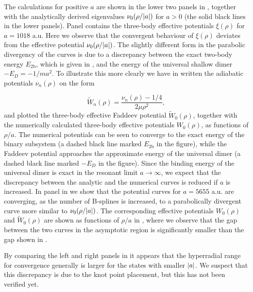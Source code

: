 The calculations for positive $a$ are shown in the lower two panels in , together with the analytically derived eigenvalues $\nu_0(\rho/\lvert a\rvert)$ for $a>0$ (the solid black lines in the lower panels). Panel  contains the three-body effective potentials $\xi(\rho)$ for $a=1018$ a.u. Here we observe that the convergent behaviour of $\xi(\rho)$ deviates from the effective potential $\nu_0(\rho/\lvert a\rvert)$. The slightly different form in the parabolic divergency of the curves is due to a discrepancy between the exact two-body energy $E_{2\mathrm{b}}$, which is given in , and the energy of the universal shallow dimer $-E_D=-1/ma^2$. To illustrate this more clearly we have in  written the adiabatic potentials $\nu_{n}(\rho)$ on the form  

\begin{equation}
\widetilde{W}_n(\rho) =\frac{\nu_n(\rho)-1/4}{2\mu \rho^2},
\end{equation}
and plotted the three-body effective Faddeev potential $\widetilde{W}_{0}(\rho)$, together with the numerically calculated three-body effective potentials $W_{0}(\rho)$, as functions of $\rho/a$. The numerical potentials can be seen to converge to the exact energy of the binary subsystem (a dashed black line marked $E_{2\mathrm{b}}$ in the figure), while the Faddeev potential approaches the approximate energy of the universal dimer (a dashed black line marked $-E_D$ in the figure). Since the binding energy of the universal dimer is exact in the resonant limit $a \rightarrow \infty$, we expect that the discrepancy between the analytic and the numerical curves is reduced if $a$ is increased. In panel  in  we show that the potential curves for $a=5655$ a.u. are converging, as the number of B-splines is increased, to a parabolically divergent curve more similar to $\nu_0(\rho/\lvert a\rvert)$. The corresponding effective potentials $W_{0}(\rho)$ and $\widetilde{W}_0(\rho)$ are shown as functions of $\rho/a$ in , where we observe that the gap between the two curves in the asymptotic region is significantly smaller than the gap shown in . 

By comparing the left and right panels in  it appears that the hyperradial range for convergence generally is larger for the states with smaller $\lvert a\rvert$. We suspect that this discrepancy is due to the knot point placement, but this has not been verified yet. 

